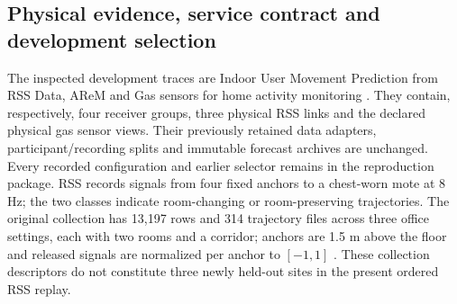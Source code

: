 \documentclass[10pt]{article}
\begin{document}
\subsection{Physical evidence, service contract and development selection}
The inspected development traces are Indoor User Movement Prediction from
RSS Data, AReM and Gas sensors for home activity monitoring
\cite{rss348,arem366,gashome362}. They contain, respectively, four
receiver groups, three physical RSS links and the declared physical gas
sensor views. Their previously retained data adapters, participant/recording
splits and immutable forecast archives are unchanged. Every recorded
configuration and earlier selector remains in the reproduction package.
RSS records signals from four fixed anchors to a chest-worn mote at 8 Hz;
the two classes indicate room-changing or room-preserving trajectories.
The original collection has 13,197 rows and 314 trajectory files across
three office settings, each with two rooms and a corridor; anchors are
1.5 m above the floor and released signals are normalized per anchor to
$[-1,1]$ \cite{rss348}. These collection descriptors do not constitute
three newly held-out sites in the present ordered RSS replay.
\end{document}
